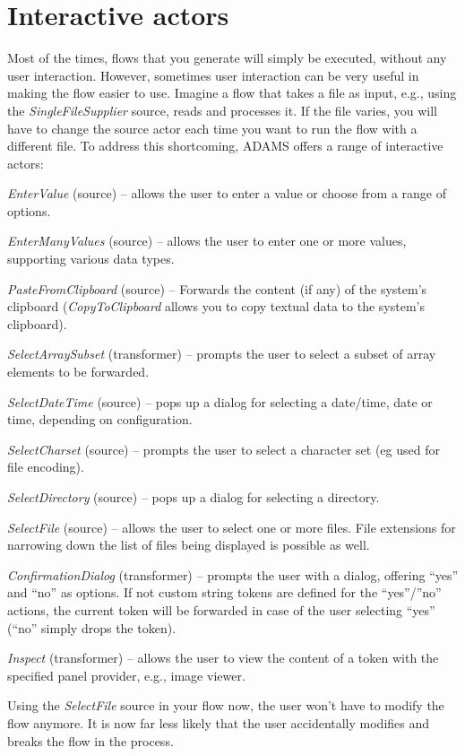 \section{Interactive actors}
\label{interactive_actors}
Most of the times, flows that you generate will simply be executed, without any
user interaction. However, sometimes user interaction can be very useful in
making the flow easier to use. Imagine a flow that takes a file as input, e.g.,
using the \textit{SingleFileSupplier} source, reads and processes it. If the
file varies, you will have to change the source actor each time you want to run
the flow with a different file. To address this shortcoming, ADAMS offers a
range of interactive actors:
\begin{tight_itemize}
	\item \textit{EnterValue} (source) -- allows the user to enter a value or
	choose from a range of options.
	\item \textit{EnterManyValues} (source) -- allows the user to enter one
	or more values, supporting various data types.
	\item \textit{PasteFromClipboard} (source) -- Forwards the content (if any) of
	the system's clipboard (\textit{CopyToClipboard} allows you to copy textual
	data to the system's clipboard).
	\item \textit{SelectArraySubset} (transformer) -- prompts the user to select
	a subset of array elements to be forwarded.
	\item \textit{SelectDateTime} (source) -- pops up a dialog for selecting a
	date/time, date or time, depending on configuration.
	\item \textit{SelectCharset} (source) -- prompts the user to select a
	character set (eg used for file encoding).
	\item \textit{SelectDirectory} (source) -- pops up a dialog for selecting a
	directory.
	\item \textit{SelectFile} (source) -- allows the user to select one or more
	files. File extensions for narrowing down the list of files being displayed is
	possible as well.
	\item \textit{ConfirmationDialog} (transformer) -- prompts the user with a
	dialog, offering ``yes'' and ``no'' as options. If not custom string tokens are
	defined for the ``yes''/''no'' actions, the current token will be forwarded in
	case of the user selecting ``yes'' (``no'' simply drops the token).
	\item \textit{Inspect} (transformer) -- allows the user to view the content
	of a token with the specified panel provider, e.g., image viewer.
\end{tight_itemize}
Using the \textit{SelectFile} source in your flow now, the user won't have to
modify the flow anymore. It is now far less likely that the user accidentally
modifies and breaks the flow in the process.

